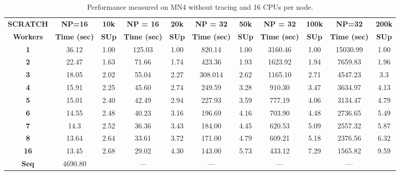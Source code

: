 \documentclass[10pt,journal,compsoc]{IEEEtran}
\let\MYoriglatexcaption\caption
\renewcommand{\caption}[2][\relax]{\MYoriglatexcaption[#2]{#2}}
\begin{document}
\begin{table}[!t]
\centering
\caption{Performance measured on MN4 without tracing and 16 CPUs per node.}
\label{performance_table}
\begin{tabular*}{\textwidth}{c|cc|cc|cc|cc|cc}
 \textbf{SCRATCH}   & \textbf{NP=16} & \textbf{10k} & \textbf{NP = 16} & \textbf{20k} & \textbf{NP = 32} & \textbf{50k} & \textbf{NP = 32} & \textbf{100k} &  \textbf{NP=32} & \textbf{ 200k}\\ \cline{2-11} 
\textbf{Workers}     & \textbf{Time (sec)}   & \textbf{SUp}   & \textbf{Time (sec)}     & \textbf{SUp}   & \textbf{Time (sec)}     & \textbf{SUp}   & \textbf{Time (sec)}    & \textbf{SUp}    & \textbf{Time (sec)}   & \textbf{SUp} \\ \cline{1-11}
\textbf{1}           & 36.12        & 1.00              & 125.03          & 1.00              & 820.14           & 1.00              & 3160.46          & 1.00  &   15030.99 & 1.00          \\
\textbf{2}           & 22.47          & 1.63           & 71.66            & 1.74           & 423.36           & 1.93           & 1623.92          & 1.94 & 7659.83 & 1.96        \\
\textbf{3}           & 18.05          & 2.02           & 55.04           & 2.27           & 308.014          & 2.62           & 1165.10         & 2.71 & 4547.23 & 3.3           \\
\textbf{4}           & 15.91         & 2.25           & 45.60           & 2.74           & 249.59           & 3.28           & 910.30            & 3.47   & 3634.97 & 4.13        \\
\textbf{5}           & 15.01          & 2.40           & 42.49           & 2.94           & 227.93           & 3.59           & 777.19          & 4.06  & 3134.47 & 4.79         \\
\textbf{6}           & 14.55          & 2.48           & 40.23            & 3.16           & 196.69           & 4.16           & 703.90            & 4.48 & 2736.65 & 5.49           \\
\textbf{7}           & 14.3           & 2.52           & 36.36           & 3.43           & 184.00              & 4.45           & 620.53          & 5.09 & 2557.32 & 5.87           \\
\textbf{8}           & 13.64         & 2.64           & 33.61           & 3.72           & 171.00              & 4.79           & 609.21          & 5.18 & 2376.56 & 6.32           \\
\textbf{16}          & 13.45          & 2.68           & 29.02           & 4.30           & 143.00              & 5.73           & 433.12          & 7.29 & 1565.82 & 9.59           \\ \cline{1-11}
\textbf{Seq} & 4690.80         &                & ---              &                & ---              &                & ---              & & --- &                
\end{tabular*}
\end{table}
\end{document}
